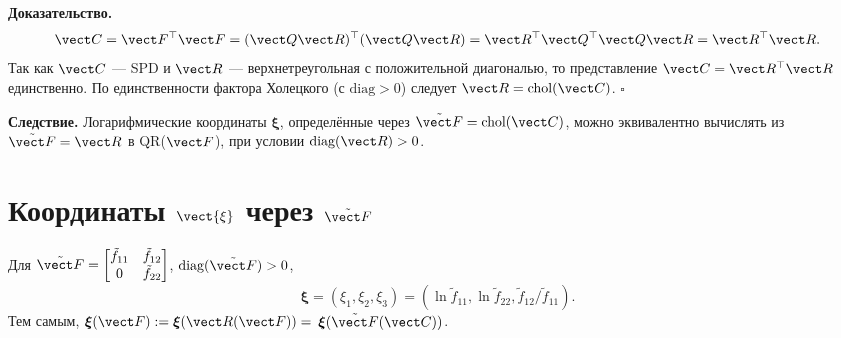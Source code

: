 \textbf{Доказательство.}
\begin{equation}
\vect C = \vect F^{\top}\vect F = (\vect Q \vect R)^{\top}(\vect Q \vect R) = \vect R^{\top} \vect Q^{\top} \vect Q \vect R = \vect R^{\top} \vect R.
\end{equation}
Так как $\vect C$ — SPD и $\vect R$ — верхнетреугольная с положительной диагональю, то представление $\vect C = \vect R^{\top}\vect R$ единственно. По единственности фактора Холецкого (с $\text{diag} > 0$) следует $\vect R = \text{chol}(\vect C)$. $\square$

\textbf{Следствие.} Логарифмические координаты $\boldsymbol{\xi}$, определённые через $\tilde{\vect F} = \text{chol}(\vect C)$, можно эквивалентно вычислять из $\tilde{\vect F} = \vect R$ в QR($\vect F$), при условии $\text{diag}(\vect R) > 0$.

\section{Координаты $\vect{\xi}$ через $\tilde{\vect F}$}

Для $\tilde{\vect F} = \begin{bmatrix} \tilde f_{11} & \tilde f_{12} \\ 0 & \tilde f_{22} \end{bmatrix}$, $\text{diag}(\tilde{\vect F}) > 0$,
\begin{equation}
\boldsymbol{\xi} = (\xi_1, \xi_2, \xi_3) = (\ln \tilde f_{11}, \ln \tilde f_{22}, \tilde f_{12}/\tilde f_{11}).
\end{equation}
Тем самым, $\boldsymbol{\xi}(\vect F) := \boldsymbol{\xi}(\vect R(\vect F)) = $ $\boldsymbol{\xi}(\tilde{\vect F}(\vect C))$.


